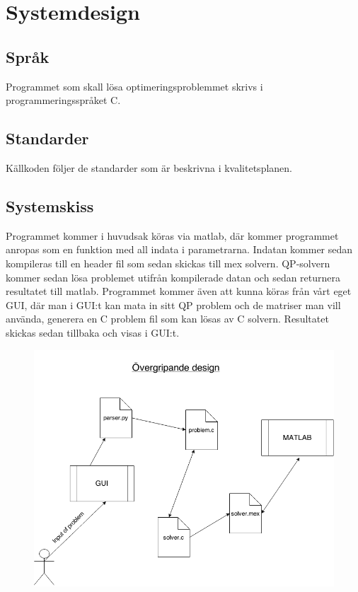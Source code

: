 \section{Systemdesign}


\subsection{Språk}
Programmet som skall lösa optimeringsproblemmet skrivs i programmeringsspråket C. 

\subsection{Standarder}
Källkoden följer de standarder som är beskrivna i kvalitetsplanen.

\subsection{Systemskiss}
Programmet kommer i huvudsak köras via matlab, där kommer programmet anropas som en funktion med all indata i parametrarna. Indatan kommer sedan kompileras till en header fil som sedan skickas till mex solvern. QP-solvern kommer sedan lösa problemet utifrån kompilerade datan och sedan returnera resultatet till matlab. Programmet kommer även att kunna köras från vårt eget GUI, där man i GUI:t kan mata in sitt QP problem och de matriser man vill använda, generera en C problem fil som kan lösas av C solvern. Resultatet skickas sedan tillbaka och visas i GUI:t.

\begin{figure}[h]
	\begin{center}
		\includegraphics[scale=0.5]{bilder/overgripande.png}
	\end{center}
\end{figure}

